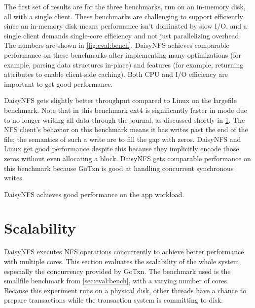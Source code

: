 The first set of results are for the three benchmarks, run on an in-memory disk, all
with a single client. These benchmarks are challenging to support efficiently
since an in-memory disk means performance isn't dominated by slow I/O, and a
single client demands single-core efficiency and not just parallelizing
overhead. The numbers are shown in \cref{fig:eval:bench}. DaisyNFS achieves
comparable performance on these benchmarks after implementing many optimizations
(for example, parsing data structures in-place) and features (for example,
returning attributes to enable client-side caching). Both CPU and I/O efficiency
are important to get good performance.

DaisyNFS gets slightly better throughput compared to Linux on the largefile
benchmark. Note that in this benchmark ext4 is significantly faster in
 mode due to no longer writing all data through the journal, as
discussed shortly in \cref{sec:eval:scale}. The NFS client's behavior on
this benchmark means it has writes past the end of the file; the semantics of
such a write are to fill the gap with zeros. DaisyNFS and Linux get good
performance despite this because they implicitly encode those zeros without even
allocating a block. DaisyNFS gets comparable performance on this benchmark
because GoTxn is good at handling concurrent synchronous writes.

DaisyNFS achieves good performance on the app workload.

\section{Scalability}
\label{sec:eval:scale}

DaisyNFS executes NFS operations concurrently to achieve better performance with
multiple cores. This section evaluates the scalability of the whole system,
especially the concurrency provided by GoTxn. The benchmark used is the smallfile benchmark from
\cref{sec:eval:bench}, with a varying number of cores. Because this experiment runs
on a physical disk, other threads have a chance to prepare transactions while the
transaction system is committing to disk.

